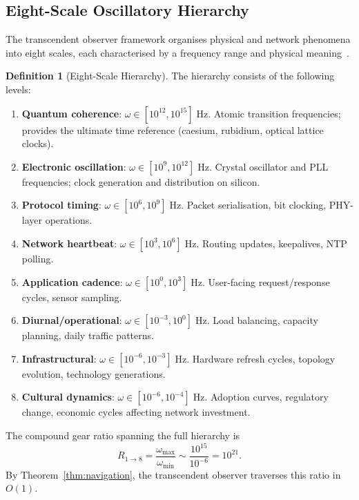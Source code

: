\documentclass[11pt,twocolumn,a4paper]{article}
\theoremstyle{definition}
\newtheorem{definition}[theorem]{Definition}
\theoremstyle{remark}
\begin{document}
\subsection{Eight-Scale Oscillatory Hierarchy}\label{sec:eight_scales}

The transcendent observer framework organises physical and network
phenomena into eight scales, each characterised by a frequency range and
physical meaning~\cite{Sachikonye2024a,Sachikonye2024b}.

\begin{definition}[Eight-Scale Hierarchy]\label{def:eight_scales}
The hierarchy consists of the following levels:
\begin{enumerate}[label=\textbf{S\arabic*}:]
  \item \textbf{Quantum coherence}: $\omega\in[10^{12},10^{15}]\;\mathrm{Hz}$.
        Atomic transition frequencies; provides the ultimate time reference
        (caesium, rubidium, optical lattice clocks).
  \item \textbf{Electronic oscillation}: $\omega\in[10^{9},10^{12}]\;\mathrm{Hz}$.
        Crystal oscillator and PLL frequencies; clock generation and
        distribution on silicon.
  \item \textbf{Protocol timing}: $\omega\in[10^{6},10^{9}]\;\mathrm{Hz}$.
        Packet serialisation, bit clocking, PHY-layer operations.
  \item \textbf{Network heartbeat}: $\omega\in[10^{3},10^{6}]\;\mathrm{Hz}$.
        Routing updates, keepalives, NTP polling.
  \item \textbf{Application cadence}: $\omega\in[10^{0},10^{3}]\;\mathrm{Hz}$.
        User-facing request/response cycles, sensor sampling.
  \item \textbf{Diurnal/operational}: $\omega\in[10^{-3},10^{0}]\;\mathrm{Hz}$.
        Load balancing, capacity planning, daily traffic patterns.
  \item \textbf{Infrastructural}: $\omega\in[10^{-6},10^{-3}]\;\mathrm{Hz}$.
        Hardware refresh cycles, topology evolution, technology generations.
  \item \textbf{Cultural dynamics}: $\omega\in[10^{-6},10^{-4}]\;\mathrm{Hz}$.
        Adoption curves, regulatory change, economic cycles affecting network
        investment.
\end{enumerate}
\end{definition}

The compound gear ratio spanning the full hierarchy is
\begin{equation}\label{eq:full_ratio}
  R_{1\to 8} = \frac{\omega_{\max}}{\omega_{\min}}
  \sim \frac{10^{15}}{10^{-6}} = 10^{21}.
\end{equation}
By Theorem~\ref{thm:navigation}, the transcendent observer traverses this
ratio in $O(1)$.
\end{document}
